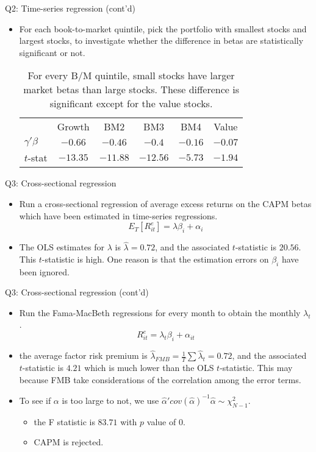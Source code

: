 \documentclass[10pt,t]{beamer}
\begin{document}
\begin{frame}{Q2: Time-series regression (cont'd)}
\begin{itemize}
  \item For each book-to-market quintile, pick the portfolio with smallest stocks and largest stocks, to investigate whether the difference in betas are statistically significant or not.
\begin{table}
\begin{tabular}{lccccc}
\toprule
 & Growth & BM2 & BM3 & BM4 & Value \\
\cmidrule{1-6}
$\gamma'\beta$ & $-0.66$ & $-0.46$ & $-0.4$ & $-0.16$ & $-0.07$ \\
$t$-stat & $-13.35$ & $-11.88$ & $-12.56$ & $-5.73$ & $-1.94$\\
\bottomrule
\end{tabular}
\caption{For every B/M quintile, small stocks have larger market betas than large stocks. These difference is significant except for the value stocks.}
\end{table}
\end{itemize}
\end{frame}


\begin{frame}{Q3: Cross-sectional regression}
\begin{itemize}
  \item Run a cross-sectional regression of average excess returns on the CAPM betas which have been estimated in time-series regressions.
  $$
  E_T[R^e_{it}] = \lambda \beta_i + \alpha_i
  $$
  \item The OLS estimates for $\lambda$ is $\hat{\lambda} = 0.72$, and the associated $t$-statistic is $20.56$. This $t$-statistic is high. One reason is that the estimation errors on $\beta_i$ have been ignored.
\end{itemize}
\end{frame}

\begin{frame}{Q3: Cross-sectional regression (cont'd)}
\begin{itemize}
  \item Run the Fama-MacBeth regressions for every month to obtain the monthly $\lambda_t$.
  $$
  R_{it}^e = \lambda_t \beta_i + \alpha_{it}
  $$
  \item the average factor risk premium is $\hat{\lambda}_{FMB} = \frac{1}{T}\sum \hat{\lambda}_t = 0.72$, and the associated $t$-statistic is $4.21$ which is much lower than the OLS $t$-statistic. This may because FMB take considerations of the correlation among the error terms.
  \item To see if $\alpha$ is too large to not, we use $\hat{\alpha}'cov(\hat{\alpha})^{-1}\hat{\alpha} \sim \chi^2_{N-1}$.
  \begin{itemize}
    \item the F statistic is $83.71$ with $p$ value of $0$.
    \item CAPM is rejected.
  \end{itemize}
\end{itemize}
\end{frame}
\end{document}
